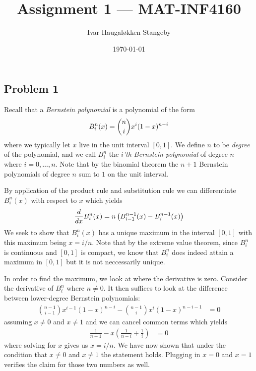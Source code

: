 \documentclass{amsart}
\title{Assignment 1 --- MAT-INF4160}
\author{Ivar Haugal{\o}kken Stangeby}
\date{\today}
\begin{document}
\maketitle

\subsection*{Problem 1} 
\label{par:problem_1}

Recall that a \emph{Bernstein polynomial} is a polynomial of the form
\begin{equation}
	\notag
	B_{i}^{n}(x) = {n \choose i} x^i (1 - x)^{n-i}
\end{equation}
where we typically let $x$ live in the unit interval $\left[ 0, 1
\right]$.  We define $n$ to be \emph{degree} of the polynomial, and we
call $B_i^n$ the \emph{$i$'th Bernstein polynomial} of degree $n$ where $i
= 0, \ldots, n$.  Note that by the binomial theorem the $n + 1$ Bernstein
polynomials of degree $n$ sum to $1$ on the unit interval.

By application of the product rule and substitution rule we can
differentiate $B_i^n(x)$ with respect to $x$ which yields
\begin{equation}
	\notag
	\frac{d}{dx}B_i^n(x) = n \left(B_{i-1}^{n-1}(x) - B_{i}^{n-1}(x) \right)
\end{equation}
We seek to show that $B_i^n(x)$ has a unique maximum in the interval $[0, 1]$
with this maximum being $x = i / n$. Note that by the extreme value theorem,
since $B_i^n$ is continuous and $[0, 1]$ is compact, we know that $B_i^n$ does
indeed attain a maximum in $[0, 1]$ but it is not neccessarily unique.

In order to find the maximum, we look at where the derivative is zero.
Consider the derivative of $B_i^n$ where $n \neq 0$. It then suffices to look
at the difference between lower-degree Bernstein polynomials:
\begin{align*}
	{n-1 \choose i-1}x^{i-1}(1 - x)^{n-i} - {n-1 \choose i}x^i(1-x)^{n-i-1} &= 0
\end{align*}
assuming $x \neq 0$ and $x \neq 1$ and we can cancel common terms which yields
\begin{align*}
	\frac{1}{n-1} - x \left( \frac{1}{n - i} + \frac{1}{i} \right) &= 0
\end{align*}
where solving for $x$ gives us $x = i / n$. We have now shown that under the
condition that $x \neq 0$ and $x \neq 1$ the statement holds. Plugging in $x =
0$ and $x = 1$ verifies the claim for those two numbers as well.
\end{document}
